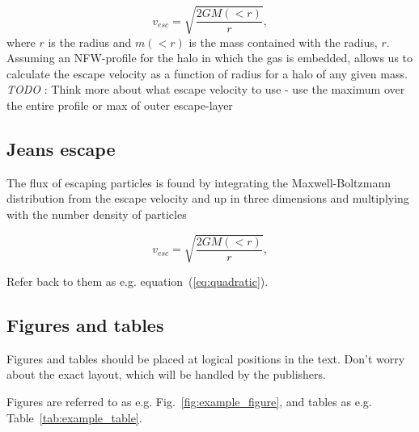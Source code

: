\documentclass[a4paper,fleqn,usenatbib]{mnras}
\newcommand{\todo}[3]{{\color{#2}\emph{#1}: #3}}
\newcommand{\jtodo}[1]{\todo{TODO }{red}{#1}}
\begin{document}
\begin{equation}
v_{esc} = \sqrt{ \frac{2 G M(<r)}{r}},
\label{eq:escape}
\end{equation}
where $r$ is the radius and $m(<r)$ is the mass contained with the radius, $r$. Assuming an NFW-profile \citep{Navarro1995} for the halo in which the gas is embedded, allows us to calculate the escape velocity as a function of radius for a halo of any given mass. \jtodo{Think more about what escape velocity to use - use the maximum over the entire profile or max of outer escape-layer}


\subsection{Jeans escape}
\label{sec:Jeans} 

The flux of escaping particles is found by integrating the Maxwell-Boltzmann distribution from the escape velocity and up in three dimensions and multiplying with the number density of particles

\begin{equation}
v_{esc} = \sqrt{ \frac{2 G M(<r)}{r}},
\label{eq:Jeansflux}
\end{equation}







Refer back to them as e.g. equation~(\ref{eq:quadratic}).

\subsection{Figures and tables}

Figures and tables should be placed at logical positions in the text. Don't
worry about the exact layout, which will be handled by the publishers.

Figures are referred to as e.g. Fig.~\ref{fig:example_figure}, and tables as
e.g. Table~\ref{tab:example_table}.
\end{document}
